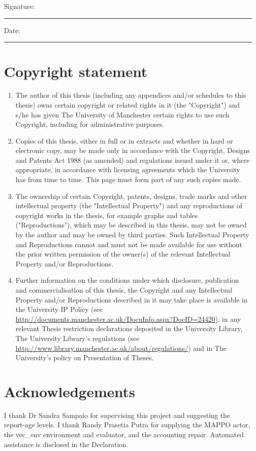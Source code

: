 \documentclass[12pt,a4paper]{article}
\begin{document}
\bigskip
Signature: \rule{60mm}{0.3pt}\qquad Date: \rule{25mm}{0.3pt}
\clearpage
\section*{Copyright statement}
\begin{enumerate}
\item[(i)] The author of this thesis (including any appendices and/or schedules to this thesis) owns certain copyright or related rights in it (the "Copyright") and s/he has given The University of Manchester certain rights to use such Copyright, including for administrative purposes.

\item[(ii)] Copies of this thesis, either in full or in extracts and whether in hard or electronic copy, may be made only in accordance with the Copyright, Designs and Patents Act 1988 (as amended) and regulations issued under it or, where appropriate, in accordance with licensing agreements which the University has from time to time. This page must form part of any such copies made.

\item[(iii)] The ownership of certain Copyright, patents, designs, trade marks and other intellectual property (the "Intellectual Property") and any reproductions of copyright works in the thesis, for example graphs and tables ("Reproductions"), which may be described in this thesis, may not be owned by the author and may be owned by third parties. Such Intellectual Property and Reproductions cannot and must not be made available for use without the prior written permission of the owner(s) of the relevant Intellectual Property and/or Reproductions.

\item[(iv)] Further information on the conditions under which disclosure, publication and commercialisation of this thesis, the Copyright and any Intellectual Property and/or Reproductions described in it may take place is available in the University IP Policy (see \url{http://documents.manchester.ac.uk/DocuInfo.aspx?DocID=24420}), in any relevant Thesis restriction declarations deposited in the University Library, The University Library's regulations (see \url{http://www.library.manchester.ac.uk/about/regulations/}) and in The University's policy on Presentation of Theses.

\end{enumerate}
\clearpage
\section*{Acknowledgements}
I thank Dr Sandra Sampaio for supervising this project and suggesting the report-age levels. I thank Randy Prasetia Putra for supplying the MAPPO actor, the vec\_env environment and evaluator, and the accounting repair. Automated assistance is disclosed in the Declaration.
\clearpage
\end{document}
